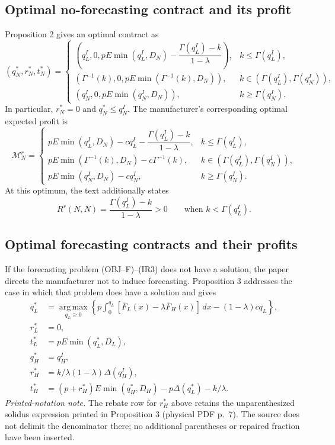 \documentclass{article}
\begin{document}
\subsection*{Optimal no-forecasting contract and its profit}
Proposition 2 gives an optimal contract as
\[
(q_N^*,r_N^*,t_N^*)=
\begin{cases}
\left(q_L^I,0,pE\min(q_L^I,D_N)
 -\dfrac{\Gamma(q_L^I)-k}{1-\lambda}\right),
 &k\leq\Gamma(q_L^I),\\[6pt]
\left(\Gamma^{-1}(k),0,pE\min(\Gamma^{-1}(k),D_N)\right),
 &k\in(\Gamma(q_L^I),\Gamma(q_N^I)),\\[6pt]
\left(q_N^I,0,pE\min(q_N^I,D_N)\right),
 &k\geq\Gamma(q_N^I).
\end{cases}
\]
In particular, $r_N^*=0$ and $q_N^*\leq q_N^I$. The manufacturer's corresponding optimal expected profit is
\begin{equation}
\mathcal M_N^r=
\begin{cases}
pE\min(q_L^I,D_N)-cq_L^I
 -\dfrac{\Gamma(q_L^I)-k}{1-\lambda},
 &k\leq\Gamma(q_L^I),\\[6pt]
pE\min(\Gamma^{-1}(k),D_N)-c\Gamma^{-1}(k),
 &k\in(\Gamma(q_L^I),\Gamma(q_N^I)),\\[6pt]
pE\min(q_N^I,D_N)-cq_N^I,
 &k\geq\Gamma(q_N^I).
\end{cases}
\tag{1}
\end{equation}
At this optimum, the text additionally states
\[
R^r(N,N)=\frac{\Gamma(q_L^I)-k}{1-\lambda}>0
\qquad\text{when }k<\Gamma(q_L^I).
\]

\subsection*{Optimal forecasting contracts and their profits}
If the forecasting problem (OBJ--F)--(IR3) does not have a solution, the paper directs the manufacturer not to induce forecasting. Proposition 3 addresses the case in which that problem does have a solution and gives
\begin{align*}
q_L^*&=\operatorname*{arg\,max}_{q_L\geq0}
 \left\{p\int_0^{q_L}[\bar F_L(x)-\lambda\bar F_H(x)]\,dx
 -(1-\lambda)cq_L\right\},\\
r_L^*&=0,\\
t_L^*&=pE\min(q_L^*,D_L),\\
q_H^*&=q_H^I,\\
r_H^*&=k/\lambda(1-\lambda)\Delta(q_H^I),\\
t_H^*&=(p+r_H^*)E\min(q_H^*,D_H)
 -p\Delta(q_L^*)-k/\lambda.
\end{align*}
\noindent\emph{Printed-notation note.} The rebate row for $r_H^*$ above retains the unparenthesized solidus expression printed in Proposition 3 (physical PDF p.~7). The source does not delimit the denominator there; no additional parentheses or repaired fraction have been inserted.
\end{document}
